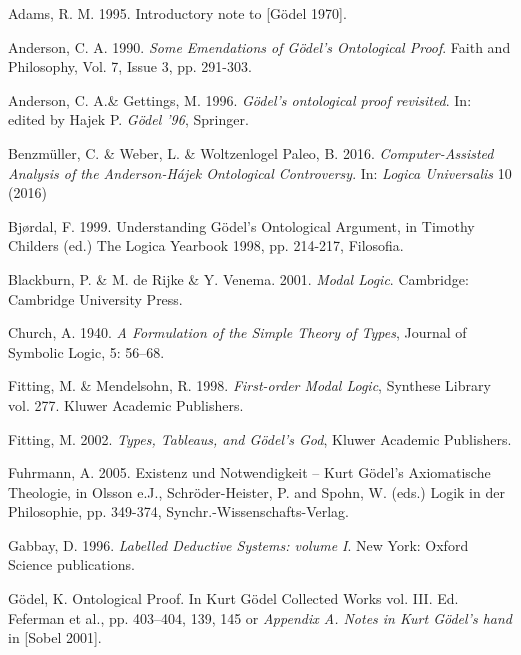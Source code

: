 \documentclass[smallextended]{svjour3}
\begin{document}
\begin{thebibliography}{9}

Adams, R. M. 1995. Introductory note to [G\"odel 1970]. 

Anderson, C. A. 1990. {\itshape Some Emendations of G\"odel's Ontological Proof}. Faith and Philosophy, Vol. 7, Issue 3, pp. 291-303. 

Anderson, C. A.\& Gettings, M. 1996.  {\itshape G\"odel's ontological proof revisited}. In: edited by Hajek P. {\itshape G\"odel '96},  Springer. 

Benzm\"uller, C. \& Weber, L. \& Woltzenlogel Paleo, B. 2016. {\itshape Computer-Assisted Analysis of the Anderson-H\'ajek Ontological Controversy}. In: {\itshape Logica Universalis} 10 (2016)


Bj{\o}rdal, F. 1999. Understanding G\"odel's Ontological Argument, in Timothy Childers (ed.) The Logica Yearbook 1998, pp. 214-217, Filosofia.

Blackburn, P. \&  M. de Rijke \& Y. Venema. 2001. {\itshape Modal Logic}. Cambridge: Cambridge University Press.

Church, A. 1940. {\itshape A Formulation of the Simple Theory of Types}, Journal of Symbolic Logic, 5: 56--68. 

Fitting, M. \& Mendelsohn, R. 1998.  {\itshape First-order Modal Logic}, Synthese Library vol. 277. Kluwer Academic Publishers.  

Fitting, M. 2002.  {\itshape Types, Tableaus, and G\"odel's God}, Kluwer Academic Publishers.  

Fuhrmann, A. 2005.
Existenz und Notwendigkeit -- Kurt G\"odel's Axiomatische Theologie, in Olsson e.J., Schr\"oder-Heister, P. and Spohn, W. (eds.) Logik in der Philosophie, pp. 349-374, Synchr.-Wissenschafts-Verlag.

Gabbay, D. 1996. {\itshape Labelled Deductive Systems: volume I}. New York: Oxford Science publications. 

G\"odel, K. Ontological Proof. In Kurt G\"odel Collected Works vol. III. Ed. Feferman et al., pp. 403--404, 139, 145 or {\itshape Appendix A. Notes in Kurt G\"odel's hand} in [Sobel 2001]. 


\end{thebibliography}
\end{document}
